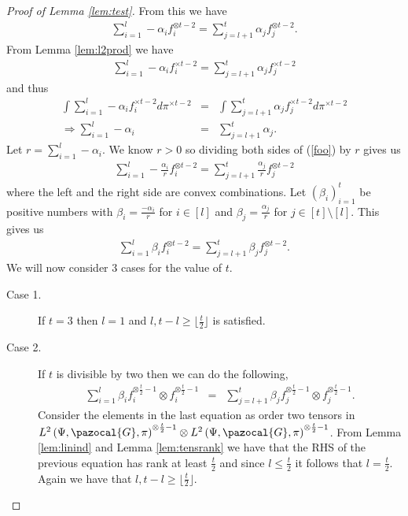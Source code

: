 \documentclass[aos,preprint]{imsart}
\def\sG{\pazocal{G}}
\theoremstyle{plain}
\theoremstyle{defintion}
\begin{document}
\begin{proof}[Proof of Lemma \ref{lem:test}]
		From this we have 
		\begin{eqnarray}\label{foo}
			\sum_{i=1}^{l}-\alpha_i f_i^{\otimes t-2}=\sum_{j=l+1}^{t}\alpha_j f_j^{\otimes t-2}.
		\end{eqnarray}
		From Lemma \ref{lem:l2prod} we have
		\begin{eqnarray*}
			\sum_{i=1}^{l}-\alpha_i f_i^{\times t-2}=\sum_{j=l+1}^{t}\alpha_j f_j^{\times t-2}
		\end{eqnarray*}
		and thus
		\begin{eqnarray*}
			\int \sum_{i=1}^{l}-\alpha_i f_i^{\times t-2} d\pi^{\times t-2 }&=&\int \sum_{j=l+1}^{t}\alpha_j f_j^{\times t-2}d\pi^{\times t-2 }\\
			\Rightarrow \sum_{i=1}^{l}-\alpha_i &=&\sum_{j=l+1}^{t}\alpha_j.
		\end{eqnarray*}
		Let $r=\sum_{i=1}^{l}-\alpha_i$. We know $r >0$ so dividing both sides of (\ref{foo}) by $r$ gives us
		\begin{eqnarray*}
			\sum_{i=1}^{l}-\frac{\alpha_i}{r} f_i^{\otimes t-2}=\sum_{j=l+1}^{t}\frac{\alpha_j}{r} f_j^{\otimes t-2}
		\end{eqnarray*}
		where the left and the right side are convex combinations. Let $\left( \beta_i \right)_{i=1}^{t}$ be positive numbers with $\beta_i = \frac{-\alpha_i}{r}$ for $i \in \left[ l \right]$ and $\beta_j = \frac{\alpha_j}{r}$ for $j\in \left[ t \right] \setminus \left[ l \right]$. This gives us
		\begin{eqnarray} \label{eqn:noidenttens}
			\sum_{i=1}^{l}\beta_i f_i^{\otimes t-2}=\sum_{j=l+1}^{t}\beta_j f_j^{\otimes t-2}.
		\end{eqnarray}
		We will now consider 3 cases for the value of $t$.
                \begin{description}
                    \item[Case 1.]If $t=3$ then $l=1$ and $l,t-l \ge \lfloor\frac{t}{2}\rfloor$ is satisfied.

                    \item[Case 2.] If $t$ is divisible by two then we can do the following,
                        \begin{eqnarray*}
                            \sum_{i=1}^{l} \beta_i f_i^{\otimes \frac{t}{2}-1}\otimes f_i^{\otimes \frac{t}{2}-1}&=&\sum_{j=l+1}^{t}\beta_j f_j^{\otimes \frac{t}{2}-1}\otimes f_j^{\otimes \frac{t}{2}-1}.
                        \end{eqnarray*}
                        \sloppy Consider the elements in the last equation as order two tensors in $ {L^2\left( \Psi, \sG, \pi \right)}^{\otimes \frac{t}{2}-1} \otimes  {L^2\left( \Psi, \sG, \pi \right)}^{ \otimes \frac{t}{2}-1} $. From Lemma \ref{lem:linind} and Lemma \ref{lem:tensrank} we have that the RHS of the previous equation has rank at least $\frac{t}{2}$ and since $l\le \frac{t}{2}$ it follows that $l=\frac{t}{2}$. Again we have that $l,t-l \ge\lfloor \frac{t}{2}\rfloor$.


\end{description}
\end{proof}
\end{document}

